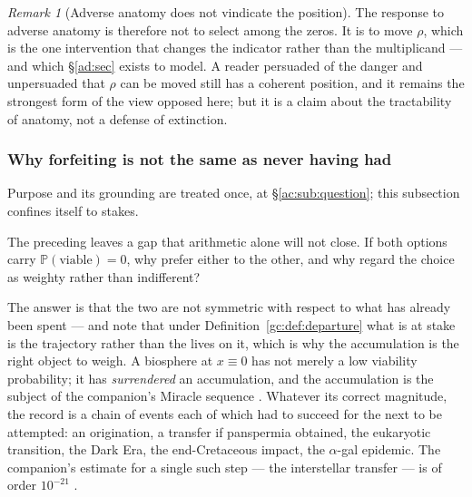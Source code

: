 \documentclass[11pt]{article}
\numberwithin{equation}{section}
\theoremstyle{plain}
\theoremstyle{definition}
\theoremstyle{remark}
\newtheorem{remark}[theorem]{Remark}
\newcommand{\PP}{\mathbb{P}}
\begin{document}
\begin{remark}[Adverse anatomy does not vindicate the position]
The response to adverse anatomy is therefore not to select among the
zeros. It is to move $\rho$, which is the one intervention that changes
the indicator rather than the multiplicand --- and which
\S\ref{ad:sec} exists to model. A reader persuaded of the danger and
unpersuaded that $\rho$ can be moved still has a coherent position, and
it remains the strongest form of the view opposed here; but it is a
claim about the tractability of anatomy, not a defense of extinction.
\end{remark}

\subsubsection{Why forfeiting is not the same as never having had}
\label{hr:subsub:stakes}

\noindent Purpose and its grounding are treated once, at
\S\ref{ac:sub:question}; this subsection confines itself to stakes.

The preceding leaves a gap that arithmetic alone will not close. If both
options carry $\PP(\text{viable})=0$, why prefer either to the other,
and why regard the choice as weighty rather than indifferent?

The answer is that the two are not symmetric with respect to what has
already been spent --- and note that under
Definition~\ref{gc:def:departure} what is at stake is the trajectory
rather than the lives on it, which is why the accumulation is the right
object to weigh. A biosphere at $x\equiv0$ has not merely a low
viability probability; it has \emph{surrendered} an accumulation, and
the accumulation is the subject of the companion's Miracle sequence
\cite{Nexus}. Whatever its correct magnitude, the record is a chain of
events each of which had to succeed for the next to be attempted: an
origination, a transfer if panspermia obtained, the eukaryotic
transition, the Dark Era, the end-Cretaceous impact, the
$\alpha$-gal epidemic. The companion's estimate for a single such
step --- the interstellar transfer --- is of order $10^{-21}$
\cite{Nexus}.
\end{document}
